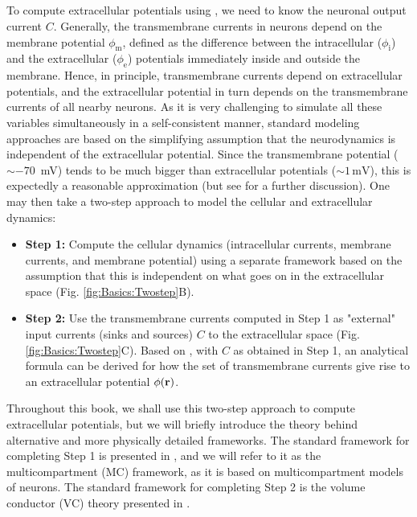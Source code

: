 \subsection{}
\label{sec:Basics:twostep}
To compute extracellular potentials using , we need to know the neuronal output current  $C$. Generally, the transmembrane currents in neurons depend on the membrane potential $\phi_\text{m}$, defined as the difference between the intracellular ($\phi_\text{i}$) and the extracellular ($\phi_\text{e}$) potentials immediately inside and outside the membrane. Hence, in principle, transmembrane currents depend on extracellular potentials, and the extracellular potential in turn depends on the transmembrane currents of all nearby neurons. As it is very challenging to simulate all these variables simultaneously in a self-consistent manner, standard modeling approaches are based on the simplifying assumption that the neurodynamics is independent of the extracellular potential. Since the transmembrane potential ($\sim -70$~\si{\milli\volt}) tends to be much bigger than extracellular potentials ($\sim 1 \,\si{\milli\volt}$), this is expectedly a reasonable approximation (but see  for a further discussion). One may then take a two-step approach to model the cellular and extracellular dynamics:

\begin{itemize}
\item {\bf Step 1:} Compute the cellular dynamics (intracellular currents, membrane currents, and membrane potential) using a separate framework based on the assumption that this is independent on what goes on in the extracellular space (Fig. \ref{fig:Basics:Twostep}B).

\item {\bf Step 2:} Use the transmembrane currents computed in Step 1 as "external" input currents (sinks and sources) $C$ to the extracellular space (Fig. \ref{fig:Basics:Twostep}C). Based on , with $C$ as obtained in Step 1, an analytical formula can be derived for how the set of transmembrane currents give rise to an extracellular potential $\phi({\bf r})$.
\end{itemize}

Throughout this book, we shall use this two-step approach to compute extracellular potentials, but we will briefly introduce the theory behind alternative and more physically detailed frameworks. The standard framework for completing Step 1 is presented in , and we will refer to it as the multicompartment (MC) framework, as it is based on multicompartment models of neurons. The standard framework for completing Step 2 is the volume conductor (VC) theory presented in  .



